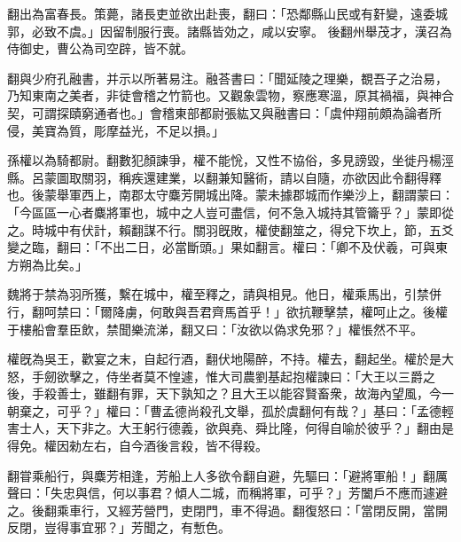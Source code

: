 \begin{pinyinscope}
 
翻出為富春長。策薨，諸長吏並欲出赴喪，翻曰：「恐鄰縣山民或有姧變，遠委城郭，必致不虞。」因留制服行喪。諸縣皆効之，咸以安寧。
 後翻州舉茂才，漢召為侍御史，曹公為司空辟，皆不就。
 
 
 
 
 翻與少府孔融書，并示以所著易注。融荅書曰：「聞延陵之理樂，覩吾子之治易，乃知東南之美者，非徒會稽之竹箭也。又觀象雲物，察應寒溫，原其禍福，與神合契，可謂探賾窮通者也。」會稽東部都尉張紘又與融書曰：「虞仲翔前頗為論者所侵，美寶為質，彫摩益光，不足以損。」
 
 
 
 
 孫權以為騎都尉。翻數犯顏諫爭，權不能恱，又性不協俗，多見謗毀，坐徙丹楊涇縣。呂蒙圖取關羽，稱疾還建業，以翻兼知醫術，請以自隨，亦欲因此令翻得釋也。後蒙舉軍西上，南郡太守麋芳開城出降。蒙未據郡城而作樂沙上，翻謂蒙曰：「今區區一心者麋將軍也，城中之人豈可盡信，何不急入城持其管籥乎？」蒙即從之。時城中有伏計，賴翻謀不行。關羽旣敗，權使翻筮之，得兌下坎上，節，五爻變之臨，翻曰：「不出二日，必當斷頭。」果如翻言。權曰：「卿不及伏羲，可與東方朔為比矣。」
 
 
魏將于禁為羽所獲，繫在城中，權至釋之，請與相見。他日，權乘馬出，引禁併行，翻呵禁曰：「爾降虜，何敢與吾君齊馬首乎！」欲抗鞭擊禁，權呵止之。後權于樓船會羣臣飲，禁聞樂流涕，翻又曰：「汝欲以偽求免邪？」權悵然不平。
 
 
 
 
 權旣為吳王，歡宴之末，自起行酒，翻伏地陽醉，不持。權去，翻起坐。權於是大怒，手劒欲擊之，侍坐者莫不惶遽，惟大司農劉基起抱權諫曰：「大王以三爵之後，手殺善士，雖翻有罪，天下孰知之？且大王以能容賢畜衆，故海內望風，今一朝棄之，可乎？」權曰：「曹孟德尚殺孔文舉，孤於虞翻何有哉？」基曰：「孟德輕害士人，天下非之。大王躬行德義，欲與堯、舜比隆，何得自喻於彼乎？」翻由是得免。權因勑左右，自今酒後言殺，皆不得殺。
 
 
 
 
 翻甞乘船行，與麋芳相逢，芳船上人多欲令翻自避，先驅曰：「避將軍船！」翻厲聲曰：「失忠與信，何以事君？傾人二城，而稱將軍，可乎？」芳闔戶不應而遽避之。後翻乘車行，又經芳營門，吏閉門，車不得過。翻復怒曰：「當閉反開，當開反閉，豈得事宜邪？」芳聞之，有慙色。
 

\end{pinyinscope}
